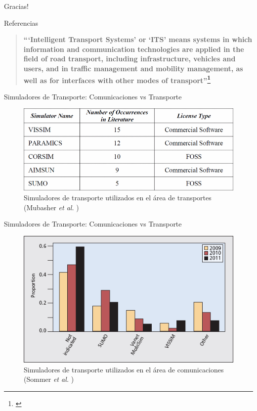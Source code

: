 \documentclass[aspectratio=169]{beamer}
\begin{document}
\begin{frame}[standout]
Gracias!
\end{frame}

\begin{frame}[c,allowframebreaks]{Referencias}
\printbibliography[heading=none]
\end{frame}

\begin{frame}%
\begin{quote}
    \centering
    \textbf{``‘Intelligent Transport Systems’ or ‘ITS’ means systems in which information and communication technologies are applied in the field of road transport, including infrastructure, vehicles and users, and in traffic management and mobility management, as well as for interfaces with other modes of transport''\footnote{\textcite{eudirective}}}
\end{quote}
\end{frame}

\begin{frame}{Simuladores de Transporte: Comunicaciones vs Transporte}
\begin{figure}[p]
    \centering
    \includegraphics[width=.8\linewidth]{figuras/popular_trafficsims.png}
    \caption{Simuladores de transporte utilizados en el área de transportes\\(Mubasher \emph{et al.} \autocite{traffic_sim_review})}
\end{figure}
\end{frame}


\begin{frame}{Simuladores de Transporte: Comunicaciones vs Transporte}
\begin{figure}[p]
\centering
\includegraphics[height=.7\textheight]{figuras/trafficsims_comp}
\caption{Simuladores de transporte utilizados en el área de comunicaciones\\(Sommer \emph{et al.} \autocite{sommer_dressler2})}
\label{fig:trafficsimscomp}
\end{figure}
\end{frame}
\end{document}
